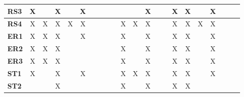 \documentclass[12pt]{article}
\begin{document}
\begin{table}[H]
\begin{adjustwidth}{-0.8in}{-1.2in}
{\begin{tabular}{c|c|c|c|c|c|c|c|c|c|c|c|c|c|c|c|c|c|c|c|c|c}
\multicolumn{1}{|l|}{\textbf{RS3}}   &      X       &              &       X      &              &       X      &              &              &              &              &              &              &      X       &              &              &      X      &      X       &             &       X     &             &             \\ \hline
\multicolumn{1}{|l|}{\textbf{RS4}}   &      X       &      X       &       X      &      X       &       X      &              &              &              &              &       X      &      X       &      X       &              &              &      X      &      X       &      X      &       X     &             &             \\ \hline
\multicolumn{1}{|l|}{\textbf{ER1}}   &      X       &      X       &       X      &              &       X      &              &              &              &              &      X       &              &      X       &              &              &      X      &      X       &             &       X     &             &             \\ \hline
\multicolumn{1}{|l|}{\textbf{ER2}}   &      X       &      X       &       X      &              &              &              &              &              &              &       X      &              &      X       &              &              &      X      &      X       &             &       X     &             &             \\ \hline
\multicolumn{1}{|l|}{\textbf{ER3}}   &      X       &      X       &       X      &              &              &              &              &              &              &       X      &              &      X       &              &              &      X      &      X       &             &       X     &             &             \\ \hline
\multicolumn{1}{|l|}{\textbf{ST1}}   &      X       &              &       X      &              &       X      &              &              &              &              &       X      &       X      &      X       &              &              &      X      &      X       &             &       X     &             &             \\ \hline
\multicolumn{1}{|l|}{\textbf{ST2}}   &              &              &       X      &              &              &              &              &              &              &       X      &              &      X       &              &              &      X      &      X       &             &             &             &             \\ \hline

\end{tabular}}
\end{adjustwidth}
\end{table}
\end{document}
